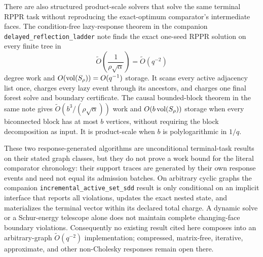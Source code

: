 There are also structured product-scale solvers that solve the same terminal
RPPR task without reproducing the exact-optimum comparator's intermediate
faces.  The condition-free lazy-response theorem in the companion
\texttt{delayed\_reflection\_ladder} note finds the exact one-seed RPPR
solution on every finite tree in
\begin{equation*}
 \widetilde O\!\left(\frac1{\rho\sqrt\alpha}\right)
 =\widetilde O(q^{-2})
\end{equation*}
degree work and $O(\operatorname{vol}(S_\rho))=O(q^{-1})$ storage.  It scans every active
adjacency list once, charges every lazy event through its ancestors, and
charges one final forest solve and boundary certificate.  The causal
bounded-block theorem in the same note gives
$\widetilde O(b^3/(\rho\sqrt\alpha))$ work and
$O(b\operatorname{vol}(S_\rho))$ storage when every biconnected block has at most $b$
vertices, without requiring the block decomposition as input.  It is
product-scale when $b$ is polylogarithmic in $1/q$.

These two response-generated algorithms are unconditional terminal-task
results on their stated graph classes, but they do not prove a work bound for
the literal comparator chronology: their support traces are generated by
their own response events and need not equal its admission batches.  On
arbitrary cyclic graphs the companion
\texttt{incremental\_active\_set\_sdd} result is only conditional on an
implicit interface that reports all violations, updates the exact nested
state, and materializes the terminal vector within its declared total
charge.  A dynamic solve or a Schur-energy telescope alone does not maintain
complete changing-face boundary violations.  Consequently no existing
result cited here composes into an arbitrary-graph
$\widetilde O(q^{-2})$ implementation; compressed, matrix-free, iterative,
approximate, and other non-Cholesky responses remain open there.
